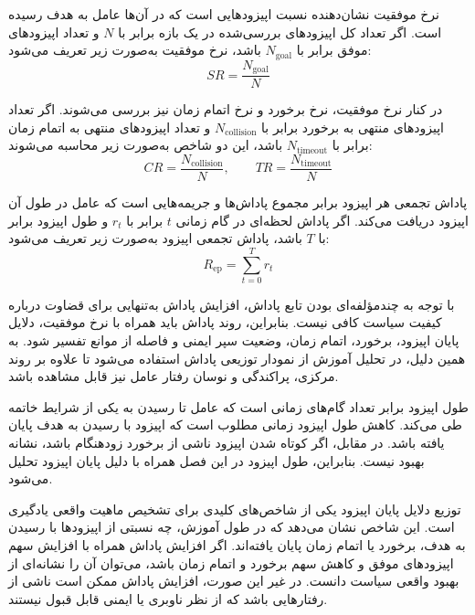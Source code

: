 نرخ موفقیت نشان‌دهنده نسبت اپیزودهایی است که در آن‌ها عامل به هدف رسیده است. اگر تعداد کل اپیزودهای بررسی‌شده در یک بازه برابر با \(N\) و تعداد اپیزودهای موفق برابر با \(N_{\mathrm{goal}}\) باشد، نرخ موفقیت به‌صورت زیر تعریف می‌شود:
\begin{equation}
	SR = \frac{N_{\mathrm{goal}}}{N}
	\label{eq:success_rate_definition}
\end{equation}

در کنار نرخ موفقیت، نرخ برخورد و نرخ اتمام زمان نیز بررسی می‌شوند. اگر تعداد اپیزودهای منتهی به برخورد برابر با \(N_{\mathrm{collision}}\) و تعداد اپیزودهای منتهی به اتمام زمان برابر با \(N_{\mathrm{timeout}}\) باشد، این دو شاخص به‌صورت زیر محاسبه می‌شوند:
\begin{equation}
	CR = \frac{N_{\mathrm{collision}}}{N},
	\qquad
	TR = \frac{N_{\mathrm{timeout}}}{N}
	\label{eq:collision_timeout_rate_definition}
\end{equation}

پاداش تجمعی هر اپیزود برابر مجموع پاداش‌ها و جریمه‌هایی است که عامل در طول آن اپیزود دریافت می‌کند. اگر پاداش لحظه‌ای در گام زمانی \(t\) برابر با \(r_t\) و طول اپیزود برابر با \(T\) باشد، پاداش تجمعی اپیزود به‌صورت زیر تعریف می‌شود:
\begin{equation}
	R_{\mathrm{ep}} = \sum_{t=0}^{T} r_t
	\label{eq:episode_return_definition}
\end{equation}

با توجه به چندمؤلفه‌ای بودن تابع پاداش، افزایش پاداش به‌تنهایی برای قضاوت درباره کیفیت سیاست کافی نیست. بنابراین، روند پاداش باید همراه با نرخ موفقیت، دلایل پایان اپیزود، برخورد، اتمام زمان، وضعیت سپر ایمنی و فاصله از موانع تفسیر شود. به همین دلیل، در تحلیل آموزش از نمودار توزیعی پاداش استفاده می‌شود تا علاوه بر روند مرکزی، پراکندگی و نوسان رفتار عامل نیز قابل مشاهده باشد.

طول اپیزود برابر تعداد گام‌های زمانی است که عامل تا رسیدن به یکی از شرایط خاتمه طی می‌کند. کاهش طول اپیزود زمانی مطلوب است که اپیزود با رسیدن به هدف پایان یافته باشد. در مقابل، اگر کوتاه شدن اپیزود ناشی از برخورد زودهنگام باشد، نشانه بهبود نیست. بنابراین، طول اپیزود در این فصل همراه با دلیل پایان اپیزود تحلیل می‌شود.

توزیع دلایل پایان اپیزود یکی از شاخص‌های کلیدی برای تشخیص ماهیت واقعی یادگیری است. این شاخص نشان می‌دهد که در طول آموزش، چه نسبتی از اپیزودها با رسیدن به هدف، برخورد یا اتمام زمان پایان یافته‌اند. اگر افزایش پاداش همراه با افزایش سهم اپیزودهای موفق و کاهش سهم برخورد و اتمام زمان باشد، می‌توان آن را نشانه‌ای از بهبود واقعی سیاست دانست. در غیر این صورت، افزایش پاداش ممکن است ناشی از رفتارهایی باشد که از نظر ناوبری یا ایمنی قابل قبول نیستند.

